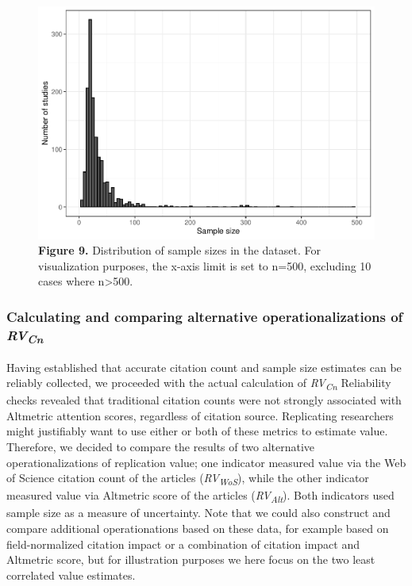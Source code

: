 \documentclass[
  english,
  man,floatsintext]{apa6}
\begin{document}
\begin{figure}
\centering
\includegraphics{RVcn_feasibility_in_social_neuroscience_files/figure-latex/fig9-1.pdf}
\caption{\label{fig:fig9}\textbf{Figure 9.} Distribution of sample sizes in the dataset. For visualization purposes, the x-axis limit is set to n=500, excluding 10 cases where n\textgreater500.}
\end{figure}

\hypertarget{calculating-and-comparing-alternative-operationalizations-of-rvcn}{%
\subsubsection{\texorpdfstring{Calculating and comparing alternative operationalizations of \emph{RV\textsubscript{Cn}}}{Calculating and comparing alternative operationalizations of RVCn}}\label{calculating-and-comparing-alternative-operationalizations-of-rvcn}}

Having established that accurate citation count and sample size estimates can be reliably collected, we proceeded with the actual calculation of \emph{RV\textsubscript{Cn}} Reliability checks revealed that traditional citation counts were not strongly associated with Altmetric attention scores, regardless of citation source. Replicating researchers might justifiably want to use either or both of these metrics to estimate value. Therefore, we decided to compare the results of two alternative operationalizations of replication value; one indicator measured value via the Web of Science citation count of the articles (\emph{RV\textsubscript{WoS}}), while the other indicator measured value via Altmetric score of the articles (\emph{RV\textsubscript{Alt}}). Both indicators used sample size as a measure of uncertainty. Note that we could also construct and compare additional operationations based on these data, for example based on field-normalized citation impact or a combination of citation impact and Altmetric score, but for illustration purposes we here focus on the two least correlated value estimates.
\end{document}
